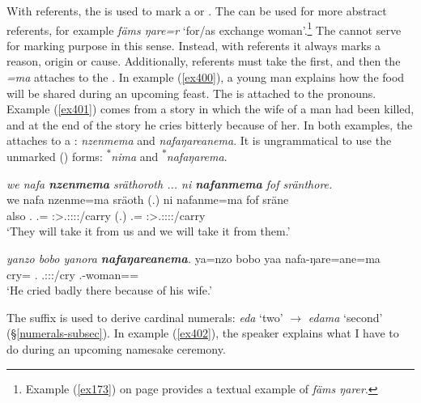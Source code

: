 With  referents, the  is used to mark a  or . The   can be used for more abstract  referents, for example \emph{fäms ŋare=r} `for/as exchange woman'.\footnote{Example (\ref{ex173}) on page \pageref{ex173} provides a textual example of \emph{fäms ŋarer}.} The   cannot serve for marking purpose in this sense. Instead, with  referents it always marks a reason, origin or cause. Additionally,  referents must take the   first, and then the  \emph{=ma} attaches to the . In example (\ref{ex400}), a young man explains how the food will be shared during an upcoming feast. The  is attached to the  pronouns. Example (\ref{ex401}) comes from a story in which the wife of a man had been killed, and at the end of the story he cries bitterly because of her. In both examples, the   attaches to a : \emph{nzenmema} and \emph{nafaŋareanema}. It is ungrammatical to use the unmarked () forms: \textsuperscript{$\ast$}\emph{nima} and \textsuperscript{$\ast$}\emph{nafaŋarema}.

\begin{exe}
	\ex \emph{we nafa \textbf{nzenmema} sräthoroth ... ni \textbf{nafanmema} fof sränthore.}\\
	\gll we nafa nzenme=ma sräoth (.) ni nafanme=ma fof sräne\\
	also \Tnsg.{\Erg} \Fnsg.\Poss={\Char} \Pl:\Sbj>\Tsg.\Masc:\Obj:\Irr:\Pfv:\Andat/carry (.) {\Fnsg} \Tnsg.\Poss={\Char} {\Emph} \Fpl:\Sbj>\Tsg.\Masc:\Obj:\Irr:\Pfv:\Venit/carry\\
	\trans `They will take it from us and we will take it from them.'
	\label{ex400}
\end{exe}
\begin{exe}
	\ex \emph{yanzo bobo yanora \textbf{nafaŋareanema}.}
	\gll ya=nzo bobo yaa nafa-ŋare=ane=ma\\
	cry={\Only} \Med.{\All} \Tsg.\Masc:\Sbj:\Pst:\Ipfv/cry \Third.\Poss-woman=\Poss=\Char\\
	\trans `He cried badly there because of his wife.'
	\label{ex401}
\end{exe}

The  suffix is used to derive cardinal numerals: \emph{eda} `two' $\rightarrow$ \emph{edama} `second' (\S\ref{numerals-subsec}). In example (\ref{ex402}), the speaker explains what I have to do during an upcoming namesake ceremony.

